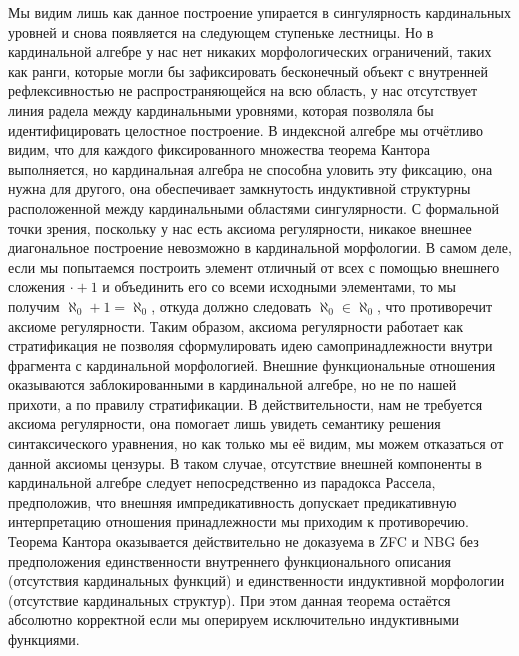 \documentclass[12pt]{article}
\begin{document}
Мы видим лишь как данное построение упирается в сингулярность кардинальных уровней и снова появляется на следующем ступеньке лестницы. Но в кардинальной алгебре у нас нет никаких морфологических ограничений, таких как ранги, которые могли бы зафиксировать бесконечный объект с внутренней рефлексивностью не распространяющейся на всю область, у нас отсутствует линия радела между кардинальными уровнями, которая позволяла бы идентифицировать целостное построение. В индексной алгебре мы отчётливо видим, что для каждого фиксированного множества теорема Кантора выполняется, но кардинальная алгебра не способна уловить эту фиксацию, она нужна для другого, она обеспечивает замкнутость индуктивной структурны расположенной между кардинальными областями сингулярности. С формальной точки зрения, поскольку у нас есть аксиома регулярности, никакое внешнее диагональное построение невозможно в кардинальной морфологии. В самом деле, если мы попытаемся построить элемент отличный от всех с помощью внешнего сложения $\cdot + 1$ и объединить его со всеми исходными элементами, то мы получим $\aleph_0 + 1 = \aleph_0$, откуда должно следовать $\aleph_0 \in \aleph_0$, что противоречит аксиоме регулярности. Таким образом, аксиома регулярности работает как стратификация не позволяя сформулировать идею самопринадлежности внутри фрагмента с кардинальной морфологией. Внешние функциональные отношения оказываются заблокированными в кардинальной алгебре, но не по нашей прихоти, а по правилу стратификации. В действительности, нам не требуется аксиома регулярности, она помогает лишь увидеть семантику решения синтаксического уравнения, но как только мы её видим, мы можем отказаться от данной аксиомы цензуры. В таком случае, отсутствие внешней компоненты в кардинальной алгебре следует непосредственно из парадокса Рассела, предположив, что внешняя импредикативность допускает предикативную интерпретацию отношения принадлежности мы приходим к противоречию. Теорема Кантора оказывается действительно не доказуема в ZFC и NBG без предположения единственности внутреннего функционального описания (отсутствия кардинальных функций) и единственности индуктивной морфологии (отсутствие кардинальных структур). При этом данная теорема остаётся абсолютно корректной если мы оперируем исключительно индуктивными функциями. 
\end{document}
